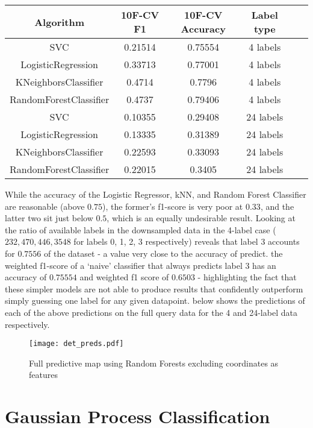 \begin{tabular}{|c|c|c|c|c|c|}
    \hline
    Algorithm & 10F-CV F1 & 10F-CV Accuracy & Label type\\\hline
    SVC & 0.21514 & 0.75554 & 4 labels \\
    LogisticRegression & 0.33713 & 0.77001 & 4 labels \\
    KNeighborsClassifier & 0.4714 & 0.7796 & 4 labels \\
    RandomForestClassifier & 0.4737 & 0.79406 & 4 labels \\
    SVC & 0.10355 & 0.29408 & 24 labels \\
    LogisticRegression & 0.13335 & 0.31389 & 24 labels \\
    KNeighborsClassifier & 0.22593 & 0.33093 & 24 labels \\
    RandomForestClassifier & 0.22015 & 0.3405 & 24 labels \\
    \hline
\end{tabular}

While the accuracy of the Logistic Regressor, kNN, and Random Forest Classifier are reasonable (above $0.75$), the former's f1-score is very poor at $0.33$, and the latter two sit just below $0.5$, which is an equally undesirable result. Looking at the ratio of available labels in the downsampled data in the 4-label case ($232,  470,  446, 3548$ for labels 0, 1, 2, 3 respectively) reveals that label 3 accounts for $0.7556$ of the dataset - a value very close to the accuracy of predict. the weighted f1-score of a `naive' classifier that always predicts label 3 has an accuracy of  $0.75554$ and weighted f1 score of $0.6503$ - highlighting the fact that these simpler models are not able to produce results that confidently outperform simply guessing one label for any given datapoint.  below shows the predictions of each of the above predictions on the full query data for the 4 and 24-label data respectively.

\begin{figure}[H]
    \texttt{[image: det\_preds.pdf]}
    \caption{Full predictive map using Random Forests excluding coordinates as features}
    \label{fig:det4maps}
\end{figure}

\section{Gaussian Process Classification}


